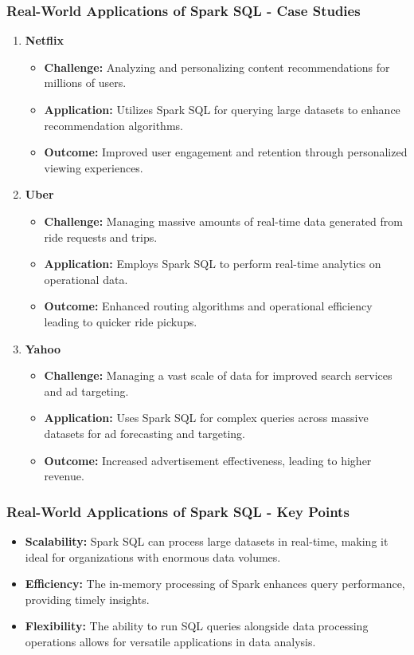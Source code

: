 \documentclass[aspectratio=169]{beamer}
\begin{document}
\begin{frame}[fragile]
    \frametitle{Real-World Applications of Spark SQL - Case Studies}
    \begin{enumerate}
        \item \textbf{Netflix}
            \begin{itemize}
                \item \textbf{Challenge:} Analyzing and personalizing content recommendations for millions of users.
                \item \textbf{Application:} Utilizes Spark SQL for querying large datasets to enhance recommendation algorithms.
                \item \textbf{Outcome:} Improved user engagement and retention through personalized viewing experiences.
            \end{itemize}
        
        \item \textbf{Uber}
            \begin{itemize}
                \item \textbf{Challenge:} Managing massive amounts of real-time data generated from ride requests and trips.
                \item \textbf{Application:} Employs Spark SQL to perform real-time analytics on operational data.
                \item \textbf{Outcome:} Enhanced routing algorithms and operational efficiency leading to quicker ride pickups.
            \end{itemize}

        \item \textbf{Yahoo}
            \begin{itemize}
                \item \textbf{Challenge:} Managing a vast scale of data for improved search services and ad targeting.
                \item \textbf{Application:} Uses Spark SQL for complex queries across massive datasets for ad forecasting and targeting.
                \item \textbf{Outcome:} Increased advertisement effectiveness, leading to higher revenue.
            \end{itemize}
    \end{enumerate}
\end{frame}

\begin{frame}[fragile]
    \frametitle{Real-World Applications of Spark SQL - Key Points}
    \begin{itemize}
        \item \textbf{Scalability:} Spark SQL can process large datasets in real-time, making it ideal for organizations with enormous data volumes.
        \item \textbf{Efficiency:} The in-memory processing of Spark enhances query performance, providing timely insights.
        \item \textbf{Flexibility:} The ability to run SQL queries alongside data processing operations allows for versatile applications in data analysis.
    \end{itemize}
\end{frame}
\end{document}
